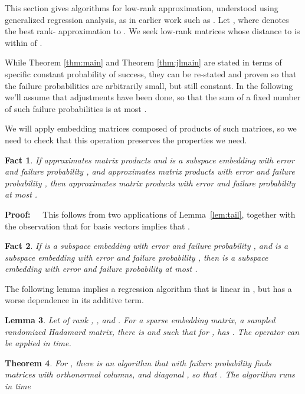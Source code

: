\documentclass{sig-alternate}
\newtheorem{theorem}{Theorem}
\newtheorem{lemma}[theorem]{Lemma}
\newtheorem{fact}[theorem]{Fact}
\def\FullBox{\hbox{\vrule width 8pt height 8pt depth 0pt}}
\def\qed{\ifmmode\qquad\FullBox\else{\unskip\nobreak\hfil
\penalty50\hskip1em\null\nobreak\hfil\FullBox
\parfillskip=0pt\finalhyphendemerits=0\endgraf}\fi}
\newenvironment{proof}{\begin{trivlist} \item {\bf Proof:~~}}
  {\qed\end{trivlist}}
\begin{document}
This section gives algorithms for low-rank approximation, understood
using generalized regression analysis, as in earlier work such as \cite{s06,cw09}.
Let , where  denotes
the best rank- approximation to .
We seek low-rank matrices whose distance to  is within  of .

While Theorem \ref{thm:main} and Theorem \ref{thm:jlmain} 
are stated in terms of specific constant probability of success,
they can be re-stated and proven so that the failure probabilities are arbitrarily small, but still
constant. In the following we'll assume that adjustments have been done, so that the sum
of a fixed number of such failure probabilities is at most .

We will apply embedding matrices composed of products of such matrices, so we need to check
that this operation preserves the properties we need.

\begin{fact}\label{fact:prod compose}
If  approximates matrix products and is a subspace
embedding with error 
and failure probability ,
and  approximates matrix products with error 
and failure probability ,
then  approximates matrix products with error 
and failure probability at most .
\end{fact}

\begin{proof}
This follows from two applications of Lemma~\ref{lem:tail}, together with
the observation that  for basis vectors
 implies that .
\end{proof}

\begin{fact}\label{fact:embed compose}
If  is a subspace embedding with error 
and failure probability ,
and  is a subspace embedding with error 
and failure probability ,
then  is a subspace embedding with error 
and failure probability at most .
\end{fact}


The following lemma implies a regression algorithm that is
linear in , but has a worse dependence in
its additive term.

\begin{lemma}\label{lem:genReg sparse}
Let  of rank , , 
and .
For  a sparse embedding matrix,
 a sampled randomized Hadamard matrix,
there is  and
 such that
for ,
 has
.
The operator  can be applied in  time.
\end{lemma}



\begin{theorem}\label{thm:SVD}
For , there is an algorithm that with failure
probability  finds matrices 
with orthonormal columns,
and diagonal , so that
.
The algorithm runs in time

\end{theorem}
\end{document}
